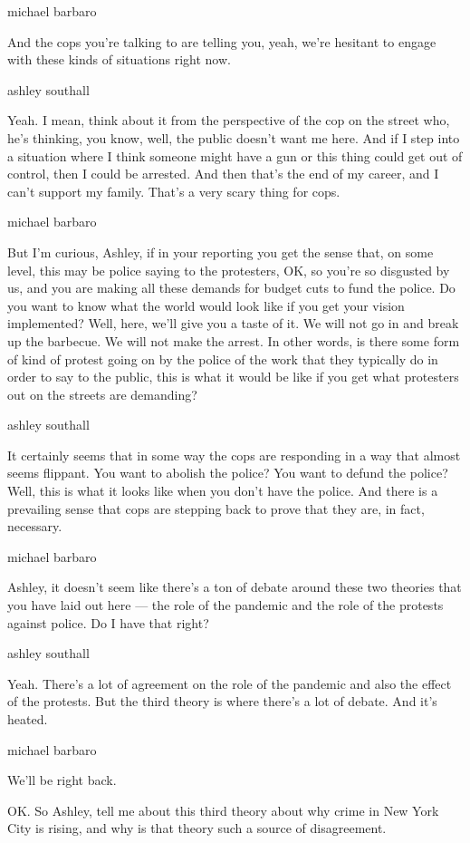 michael barbaro

And the cops you're talking to are telling you, yeah, we're hesitant to
engage with these kinds of situations right now.

ashley southall

Yeah. I mean, think about it from the perspective of the cop on the
street who, he's thinking, you know, well, the public doesn't want me
here. And if I step into a situation where I think someone might have a
gun or this thing could get out of control, then I could be arrested.
And then that's the end of my career, and I can't support my family.
That's a very scary thing for cops.

michael barbaro

But I'm curious, Ashley, if in your reporting you get the sense that, on
some level, this may be police saying to the protesters, OK, so you're
so disgusted by us, and you are making all these demands for budget cuts
to fund the police. Do you want to know what the world would look like
if you get your vision implemented? Well, here, we'll give you a taste
of it. We will not go in and break up the barbecue. We will not make the
arrest. In other words, is there some form of kind of protest going on
by the police of the work that they typically do in order to say to the
public, this is what it would be like if you get what protesters out on
the streets are demanding?

ashley southall

It certainly seems that in some way the cops are responding in a way
that almost seems flippant. You want to abolish the police? You want to
defund the police? Well, this is what it looks like when you don't have
the police. And there is a prevailing sense that cops are stepping back
to prove that they are, in fact, necessary.

michael barbaro

Ashley, it doesn't seem like there's a ton of debate around these two
theories that you have laid out here --- the role of the pandemic and
the role of the protests against police. Do I have that right?

ashley southall

Yeah. There's a lot of agreement on the role of the pandemic and also
the effect of the protests. But the third theory is where there's a lot
of debate. And it's heated.

michael barbaro

We'll be right back.

OK. So Ashley, tell me about this third theory about why crime in New
York City is rising, and why is that theory such a source of
disagreement.

